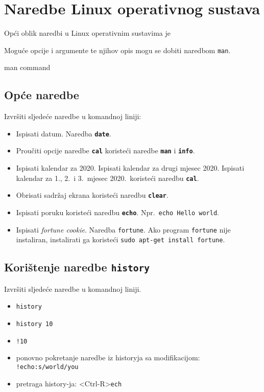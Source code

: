 \section{Naredbe Linux operativnog sustava}
Opći oblik naredbi u Linux operativnim sustavima je
Moguće opcije i argumente te njihov opis mogu se dobiti naredbom \lstinline!man!.
\begin{prototip}
man command 
\end{prototip}


\subsection*{Opće naredbe}
\begin{zadatak}
Izvršiti sljedeće naredbe u komandnoj liniji:
\begin{itemize}
\item Ispisati datum. Naredba \textbf{\texttt{date}}.
\item Proučiti opcije naredbe \textbf{\texttt{cal}} koristeći naredbe \textbf{\texttt{man}} i \textbf{\texttt{info}}.
\item Ispisati kalendar za 2020. Ispisati kalendar za drugi mjesec 2020. Ispisati kalendar za 1., 2.~i 3.~mjesec 2020.~koristeći naredbu \textbf{\texttt{cal}}.
\item Obrisati sadržaj ekrana koristeći naredbu \textbf{\texttt{clear}}.
\item Ispisati poruku koristeći naredbu \textbf{\texttt{echo}}. Npr.~\texttt{echo Hello world}.
\item Ispisati \textit{fortune cookie}. Naredba \texttt{fortune}. Ako program \lstinline!fortune! nije instaliran, instalirati ga koristeći \lstinline!sudo apt-get install fortune!. 
\end{itemize}
\end{zadatak}
\subsection*{Korištenje naredbe \texttt{history}}
\begin{zadatak}
Izvršiti sljedeće naredbe u komandnoj liniji.
\begin{itemize}
\item \texttt{history}
\item \texttt{history 10}
\item \texttt{!10}
\item ponovno pokretanje naredbe iz historyja sa modifikacijom: \texttt{!echo:s/world/you}
\item pretraga history-ja: <Ctrl-R>\texttt{ech}
\end{itemize}
\end{zadatak}
